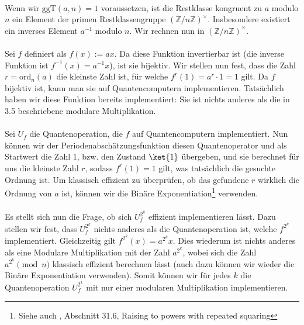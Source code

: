 \paragraph{}
Wenn wir $\text{ggT}(a, n) = 1$ voraussetzen, ist die Restklasse kongruent zu $a$ modulo $n$ ein Element der primen Restklassengruppe $(\mathbb {Z}/n\mathbb {Z} )^{\times}$. Insbesondere existiert ein inverses Element $a^{-1}$ modulo $n$. Wir rechnen nun in $(\mathbb {Z}/n\mathbb {Z})^{\times}$.
\paragraph{}
Sei $f$ definiert als $f(x) := ax$. Da diese Funktion invertierbar ist (die inverse Funktion ist $f^{-1}(x) = a^{-1}x$), ist sie bijektiv. Wir stellen nun fest, dass die Zahl $r = \text{ord}_n(a)$ die kleinste Zahl ist, für welche $f^r(1) = a^r\cdot 1 = 1$ gilt. Da $f$ bijektiv ist, kann man sie auf Quantencomputern implementieren. Tatsächlich haben wir diese Funktion bereits implementiert: Sie ist nichts anderes als die in 3.5 beschriebene modulare Multiplikation.

\paragraph{}
Sei $U_f$ die Quantenoperation, die $f$ auf Quantencomputern implementiert. Nun können wir der Periodenabschätzungsfunktion diesen Quantenoperator und als Startwert die Zahl $1$, bzw. den Zustand $\ket{1}$ übergeben, und sie berechnet für uns die kleinste Zahl $r$, sodass $f^r(1) = 1$ gilt, was tatsächlich die gesuchte Ordnung ist. Um klassisch effizient zu überprüfen, ob das gefundene $r$ wirklich die Ordnung von $a$ ist, können wir die Binäre Exponentiation\footnote{Siehe auch \cite{clrs}, Abschnitt 31.6, \grqq Raising to powers with repeated squaring\grqq{}} verwenden.
\paragraph{}
Es stellt sich nun die Frage, ob sich $U_f^{2^k}$ effizient implementieren lässt. Dazu stellen wir fest, dass $U_f^{2^k}$ nichts anderes als die Quantenoperation ist, welche $f^{2^k}$ implementiert. Gleichzeitig gilt $f^{2^k}(x) = a^{2^k}x$. Dies wiederum ist nichts anderes als eine Modulare Multiplikation mit der Zahl $a^{2^k}$, wobei sich die Zahl $a^{2^k} \pmod{n}$ klassisch effizient berechnen lässt (auch dazu können wir wieder die Binäre Exponentiation verwenden). Somit können wir für jedes $k$ die Quantenoperation $U_f^{2^k}$ mit nur einer modularen Multiplikation implementieren.
